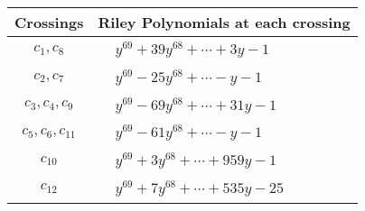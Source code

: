 \documentclass[1p]{elsarticle_modified}
\theoremstyle{definition}
\begin{document}
\begin{tabular}{m{50pt}|m{274pt}}
Crossings & \hspace{64pt}Riley Polynomials at each crossing \\
\hline $$\begin{aligned}c_{1},c_{8}\end{aligned}$$&$\begin{aligned}
&y^{69}+39 y^{68}+\cdots+3 y-1
\end{aligned}$\\
\hline $$\begin{aligned}c_{2},c_{7}\end{aligned}$$&$\begin{aligned}
&y^{69}-25 y^{68}+\cdots- y-1
\end{aligned}$\\
\hline $$\begin{aligned}c_{3},c_{4},c_{9}\end{aligned}$$&$\begin{aligned}
&y^{69}-69 y^{68}+\cdots+31 y-1
\end{aligned}$\\
\hline $$\begin{aligned}c_{5},c_{6},c_{11}\end{aligned}$$&$\begin{aligned}
&y^{69}-61 y^{68}+\cdots- y-1
\end{aligned}$\\
\hline $$\begin{aligned}c_{10}\end{aligned}$$&$\begin{aligned}
&y^{69}+3 y^{68}+\cdots+959 y-1
\end{aligned}$\\
\hline $$\begin{aligned}c_{12}\end{aligned}$$&$\begin{aligned}
&y^{69}+7 y^{68}+\cdots+535 y-25
\end{aligned}$\\
\hline
\end{tabular}
\vskip 2pc
\end{document}

